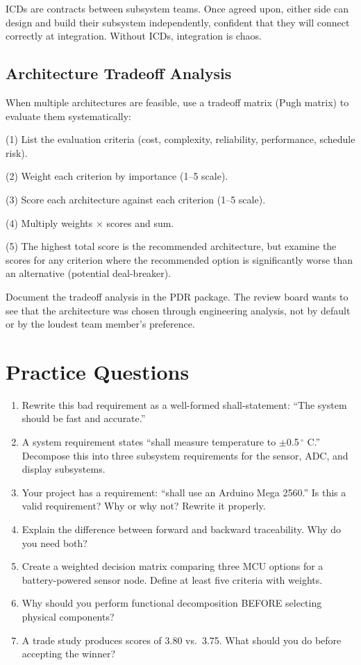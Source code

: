 ICDs are contracts between subsystem teams. Once agreed upon, either side can design and build their subsystem independently, confident that they will connect correctly at integration. Without ICDs, integration is chaos.

\subsection{Architecture Tradeoff Analysis}
When multiple architectures are feasible, use a tradeoff matrix (Pugh matrix) to evaluate them systematically:

(1) List the evaluation criteria (cost, complexity, reliability, performance, schedule risk).

(2) Weight each criterion by importance (1--5 scale).

(3) Score each architecture against each criterion (1--5 scale).

(4) Multiply weights $\times$ scores and sum.

(5) The highest total score is the recommended architecture, but examine the scores for any criterion where the recommended option is significantly worse than an alternative (potential deal-breaker).

Document the tradeoff analysis in the PDR package. The review board wants to see that the architecture was chosen through engineering analysis, not by default or by the loudest team member's preference.
\section{Practice Questions}
\begin{enumerate}[leftmargin=1.5em]
\item Rewrite this bad requirement as a well-formed shall-statement: ``The system should be fast and accurate.''
\item A system requirement states ``shall measure temperature to $\pm$0.5\,$^{\circ}$ C.'' Decompose this into three subsystem requirements for the sensor, ADC, and display subsystems.
\item Your project has a requirement: ``shall use an Arduino Mega 2560.'' Is this a valid requirement? Why or why not? Rewrite it properly.
\item Explain the difference between forward and backward traceability. Why do you need both?
\item Create a weighted decision matrix comparing three MCU options for a battery-powered sensor node. Define at least five criteria with weights.
\item Why should you perform functional decomposition BEFORE selecting physical components?
\item A trade study produces scores of 3.80 vs.\ 3.75. What should you do before accepting the winner?
\end{enumerate}

